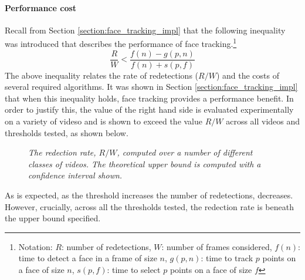 \paragraph{Performance cost}
Recall from Section \ref{section:face_tracking_impl} that the following inequality was introduced that describes the performance of face tracking.\footnote{Notation: $R$: number of redetections, $W$: number of frames considered, $f(n)$: time to detect a face in a frame of size $n$, $g(p,n)$: time to track $p$ points on a face of size $n$, $s(p,f)$: time to select $p$ points on a face of size $f$}
\begin{equation*}
    \frac{R}{W} < \frac{f(n)-g(p,n)}{f(n)+s(p,f)}
\end{equation*}
The above inequality relates the rate of redetections ($R/W$) and the costs of several required algorithms. It was shown in Section \ref{section:face_tracking_impl} that when this inequality holds, face tracking provides a performance benefit.
In order to justify this, the value of the right hand side is evaluated experimentally on a variety of videso and is shown to exceed the value $R/W$ across all videos and thresholds tested, as shown below.
\begin{figure}[H]
    \centering
    \scalebox{0.8}{}
   \caption{\textit{The redection rate, $R/W$, computed over a number of different classes of videos. The theoretical upper bound is computed with a confidence interval shown.}} 
\end{figure}
As is expected, as the threshold increases the number of redetections, decreases. However, crucially, across all the thresholds tested, the redection rate is beneath the upper bound specified.





